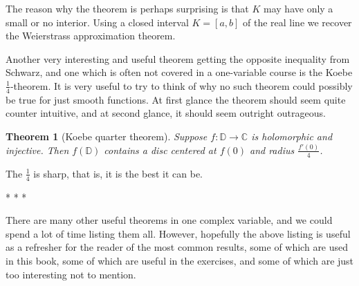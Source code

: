 \documentclass[12pt,openany]{book}
\newcommand{\C}{{\mathbb{C}}}
\newcommand{\D}{{\mathbb{D}}}
\theoremstyle{plain}
\newtheorem{thm}{Theorem}[section]
\theoremstyle{remark}
\theoremstyle{definition}
\theoremstyle{exercise}
\theoremstyle{example}
\begin{document}
The reason why the theorem is perhaps
surprising is that $K$ may have only a
small or no interior.  Using a closed interval $K=[a,b]$ of the real line we
recover the Weierstrass approximation theorem.

Another very interesting and useful theorem getting the opposite inequality from
Schwarz, and one which is often not covered in a one-variable
course is the Koebe $\frac{1}{4}$-theorem.  It is very useful to try to
think of why no such theorem could possibly be true for just smooth
functions.  At first glance the theorem should seem quite counter intuitive,
and at second glance, it should seem outright outrageous.

\begin{thm}[Koebe quarter theorem]
Suppose $f \colon \D \to \C$ is holomorphic and injective.  Then
$f(\D)$ contains a disc centered at $f(0)$ and radius $\frac{f'(0)}{4}$.
\end{thm}

The $\frac{1}{4}$ is sharp, that is, it is the best it can be.

\begin{center}
* * *
\end{center}

There are many other useful theorems in one complex variable, and we could
spend a lot of time listing them all.
However, hopefully the above listing is useful
as a refresher for the reader of the most common results, some of which are
used in this book, some of which are useful in the exercises, and some of
which are just too interesting not to mention.




\def\myDOI#1{\href{http://dx.doi.org/#1}{#1}}
\end{document}
